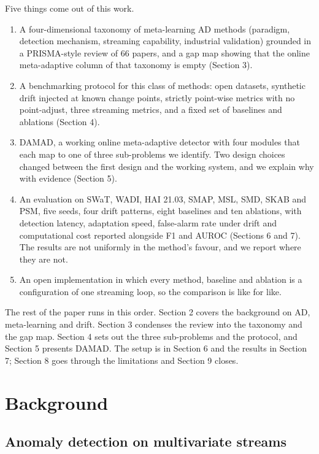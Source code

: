 Five things come out of this work.

\begin{enumerate}
\def\labelenumi{\arabic{enumi}.}
\tightlist
\item
  A four-dimensional taxonomy of meta-learning AD methods (paradigm, detection mechanism, streaming capability, industrial validation) grounded in a PRISMA-style review of 66 papers, and a gap map showing that the online meta-adaptive column of that taxonomy is empty (Section 3).
\item
  A benchmarking protocol for this class of methods: open datasets, synthetic drift injected at known change points, strictly point-wise metrics with no point-adjust, three streaming metrics, and a fixed set of baselines and ablations (Section 4).
\item
  DAMAD, a working online meta-adaptive detector with four modules that each map to one of three sub-problems we identify. Two design choices changed between the first design and the working system, and we explain why with evidence (Section 5).
\item
  An evaluation on SWaT, WADI, HAI 21.03, SMAP, MSL, SMD, SKAB and PSM, five seeds, four drift patterns, eight baselines and ten ablations, with detection latency, adaptation speed, false-alarm rate under drift and computational cost reported alongside F1 and AUROC (Sections 6 and 7). The results are not uniformly in the method's favour, and we report where they are not.
\item
  An open implementation in which every method, baseline and ablation is a configuration of one streaming loop, so the comparison is like for like.
\end{enumerate}

The rest of the paper runs in this order. Section 2 covers the background on AD, meta-learning and drift. Section 3 condenses the review into the taxonomy and the gap map. Section 4 sets out the three sub-problems and the protocol, and Section 5 presents DAMAD. The setup is in Section 6 and the results in Section 7; Section 8 goes through the limitations and Section 9 closes.

\hypertarget{background}{%
\section{Background}\label{background}}

\hypertarget{anomaly-detection-on-multivariate-streams}{%
\subsection{Anomaly detection on multivariate streams}\label{anomaly-detection-on-multivariate-streams}}

